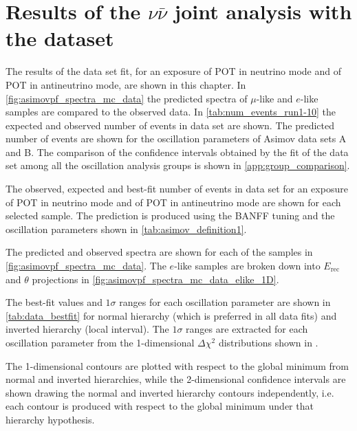 \section {Results of the $\nu\bar{\nu}$ joint analysis with the \RunPeriod dataset}
\label{sec:results}

The results of the \RunPeriod data set fit, for an exposure of \TotalPotNu POT in neutrino mode and of \TotalPotNuBar POT in antineutrino mode, are shown in this chapter. In \cref{fig:asimovpf_spectra_mc_data} the predicted spectra of $\mu$-like and $e$-like samples are compared to the observed data. In \cref{tab:num_events_run1-10} the expected and observed number of events in \RunPeriod data set are shown. The predicted number of events are shown for the oscillation parameters of Asimov data sets A and B. The comparison of the confidence intervals obtained by the fit of the \RunPeriod data set among all the oscillation analysis groups is shown in \cref{app:group_comparison}.

\begin{table}[htb]
\centering
\begin{adjustbox}{width=\textwidth, totalheight=\textheight, keepaspectratio}

\end{adjustbox}
\caption{
The observed, expected and best-fit number of events in \RunPeriod data set for an exposure of \TotalPotNu POT in neutrino mode and of \TotalPotNuBar POT in antineutrino mode are shown 
for each selected sample. The prediction is produced using the BANFF tuning and the oscillation parameters shown in \cref{tab:asimov_definition1}.
}
\label{tab:num_events_run1-10}
\end{table}

The predicted and observed spectra are shown for each of the samples in \cref{fig:asimovpf_spectra_mc_data}. The $e$-like samples are broken down into $E_\text{rec}$ and $\theta$ projections in \cref{fig:asimovpf_spectra_mc_data_elike_1D}.



The best-fit values and $1\sigma$ ranges for each oscillation parameter are shown in \cref{tab:data_bestfit} for normal hierarchy (which is preferred in all data fits) and inverted hierarchy (local interval). The $1\sigma$ ranges are extracted for each oscillation parameter from the 1-dimensional $\Delta \chi^2$ distributions shown in .

The 1-dimensional contours are plotted with respect to the global minimum from normal and inverted hierarchies, while the 2-dimensional confidence intervals are shown drawing the normal and inverted hierarchy contours independently, i.e. each contour is produced with respect to the global minimum under that hierarchy hypothesis.

